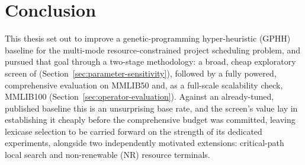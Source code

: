\chapter*{Conclusion}
\label{chap:conclusion}

This thesis set out to improve a genetic-programming hyper-heuristic (GPHH)
baseline for the multi-mode resource-constrained project scheduling
problem, and pursued that goal through a two-stage methodology: a broad,
cheap exploratory screen of 
(Section~\ref{sec:parameter-sensitivity}), followed by a fully powered,
comprehensive evaluation on MMLIB50 and, as a full-scale scalability check,
MMLIB100 (Section~\ref{sec:operator-evaluation}).  Against an
already-tuned, published baseline this is an unsurprising base rate, and
the screen's value lay in establishing it cheaply before the comprehensive
budget was committed, leaving lexicase selection to be carried forward on
the strength of its dedicated experiments, alongside two independently
motivated extensions: critical-path local search and non-renewable (NR)
resource terminals.

